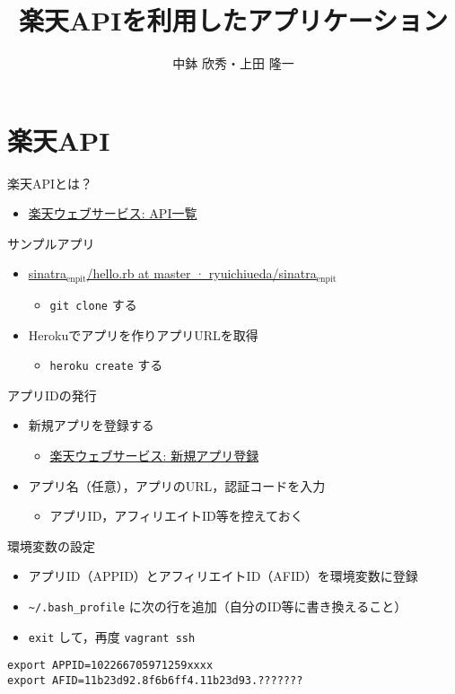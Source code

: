 \documentclass[t]{beamer}
\institute[AIIT]{産業技術大学院大学(AIIT)}
\author{中鉢 欣秀・上田 隆一}
\date{}
\title{楽天APIを利用したアプリケーション}
\begin{document}
\maketitle

\section{楽天API}
\label{sec-1}
\begin{frame}[label=sec-1-1]{楽天APIとは？}
\begin{itemize}
\item \href{http://webservice.rakuten.co.jp/document/}{楽天ウェブサービス: API一覧}
\end{itemize}
\end{frame}
\begin{frame}[fragile,label=sec-1-2]{サンプルアプリ}
 \begin{itemize}
\item \href{https://github.com/ryuichiueda/sinatra_enpit/blob/master/hello.rb}{sinatra$_{\text{enpit}}$/hello.rb at master · ryuichiueda/sinatra$_{\text{enpit}}$}
\begin{itemize}
\item \texttt{git clone} する
\end{itemize}
\item Herokuでアプリを作りアプリURLを取得
\begin{itemize}
\item \texttt{heroku create} する
\end{itemize}
\end{itemize}
\end{frame}
\begin{frame}[label=sec-1-3]{アプリIDの発行}
\begin{itemize}
\item 新規アプリを登録する
\begin{itemize}
\item \href{https://webservice.rakuten.co.jp/app/create}{楽天ウェブサービス: 新規アプリ登録}
\end{itemize}
\item アプリ名（任意），アプリのURL，認証コードを入力
\begin{itemize}
\item アプリID，アフィリエイトID等を控えておく
\end{itemize}
\end{itemize}
\end{frame}
\begin{frame}[fragile,label=sec-1-4]{環境変数の設定}
 \begin{itemize}
\item アプリID（APPID）とアフィリエイトID（AFID）を環境変数に登録
\item \texttt{\textasciitilde{}/.bash\_profile} に次の行を追加（自分のID等に書き換えること）
\item \texttt{exit} して，再度 \texttt{vagrant ssh}
\end{itemize}

\begin{verbatim}
export APPID=102266705971259xxxx
export AFID=11b23d92.8f6b6ff4.11b23d93.???????
\end{verbatim}
\end{frame}
\end{document}
